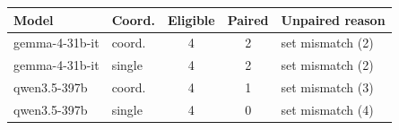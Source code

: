 \begin{tabular}{@{}llccl@{}}
\toprule
Model & Coord. & Eligible & Paired & Unpaired reason \\
\midrule
gemma-4-31b-it & coord. & 4 & 2 & set mismatch (2) \\
gemma-4-31b-it & single & 4 & 2 & set mismatch (2) \\
qwen3.5-397b & coord. & 4 & 1 & set mismatch (3) \\
qwen3.5-397b & single & 4 & 0 & set mismatch (4) \\
\bottomrule
\end{tabular}
